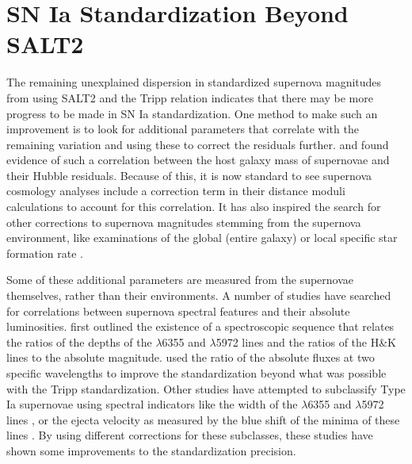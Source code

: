 \section{SN Ia Standardization Beyond SALT2}
The remaining unexplained dispersion in standardized supernova magnitudes from using SALT2 and the Tripp relation indicates that there may be more progress to be made in SN Ia standardization. One method to make such an improvement is to look for additional parameters that correlate with the remaining variation and using these to correct the residuals further. \citet{kelly_hubble_2010} and \citet{sullivan_dependence_2010} found evidence of such a correlation between the host galaxy mass of supernovae and their Hubble residuals. Because of this, it is now standard to see supernova cosmology analyses include a correction term in their distance moduli calculations to account for this correlation. It has also inspired the search for other corrections to supernova magnitudes stemming from the supernova environment, like examinations of the global (entire galaxy) or local specific star formation rate \citep{rigault_evidence_2013, rigault_confirmation_2015}.

Some of these additional parameters are measured from the supernovae themselves, rather than their environments. A number of studies have searched for correlations between supernova spectral features and their absolute luminosities. \citet{nugent_evidence_1995} first outlined the existence of a spectroscopic sequence that relates the ratios of the depths of the  $\lambda$6355 and  $\lambda$5972 lines and the ratios of the  H\&K lines to the absolute magnitude. \citet{bailey_using_2009} used the ratio of the absolute fluxes at two specific wavelengths to improve the standardization beyond what was possible with the Tripp standardization. Other studies have attempted to subclassify Type Ia supernovae using spectral indicators like the width of the  $\lambda$6355 and  $\lambda$5972 lines \citep{branch_comparative_2006}, or the ejecta velocity as measured by the blue shift of the minima of these lines \citep{wang_improved_2009, foley_measuring_2011, foley_relation_2012}. By using different corrections for these subclasses, these studies have shown some improvements to the standardization precision.

